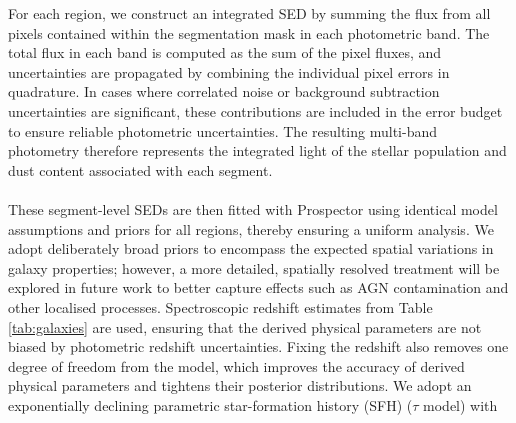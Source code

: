 \documentclass[fleqn,usenatbib]{mnras}
\begin{document}
For each region, we construct an integrated SED by summing the flux from all pixels contained within the segmentation mask in each photometric band. The total flux in each band is computed as the sum of the pixel fluxes, and uncertainties are propagated by combining the individual pixel errors in quadrature. In cases where correlated noise or background subtraction uncertainties are significant, these contributions are included in the error budget to ensure reliable photometric uncertainties. The resulting multi-band photometry therefore represents the integrated light of the stellar population and dust content associated with each segment.\\
\\
These segment-level SEDs are then fitted with Prospector using identical model assumptions and priors for all regions, thereby ensuring a uniform analysis. We adopt deliberately broad priors to encompass the expected spatial variations in galaxy properties; however, a more detailed, spatially resolved treatment will be explored in future work to better capture effects such as AGN contamination and other localised processes. Spectroscopic redshift estimates from Table \ref{tab:galaxies} are used, ensuring that the derived physical parameters are not biased by photometric redshift uncertainties. Fixing the redshift also removes one degree of freedom from the model, which improves the accuracy of derived physical parameters and tightens their posterior distributions. We adopt an exponentially declining parametric star-formation history (SFH) ($\tau$ model) with
\end{document}
